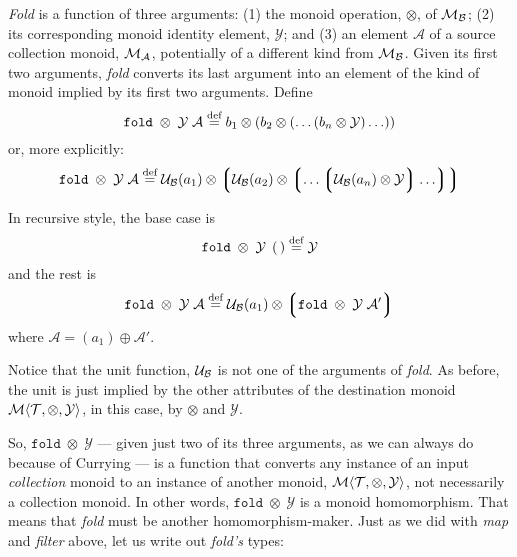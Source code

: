 \emph{Fold} is a function of three arguments: (1) the monoid operation, $\otimes$, of $\mathcal{M}_{\mathcal{B}}$; (2) its corresponding monoid identity element, $\mathcal{Y}$; and (3) an element $\mathcal{A}$ of a source collection monoid, $\mathcal{M}_{\mathcal{A}}$, potentially of a different kind from $\mathcal{M}_{\mathcal{B}}$. Given its first two arguments, \emph{fold} converts its last argument into an element of the kind of monoid implied by its first two arguments. Define
\begin{equation}
    \mathtt{fold}\;\otimes\;\mathcal{Y}\;\mathcal{A} \overset{\text{def}}{=}
        b_{1}\otimes
        (b_{2}\otimes
        (\ldots(b_{n}\otimes
        \mathit{\mathcal{Y}})\ldots))
  \label{eqn:folddef}
\end{equation}
or, more explicitly:
  $$ \mathtt{fold}\;\otimes\;\mathcal{Y}\;\mathcal{A} \overset{\text{def}}{=}
        \mathcal{U}_{\mathcal{B}}(a_1)\otimes
        \left\lgroup
        \mathcal{U}_{\mathcal{B}}(a_2)\otimes
        \left\lgroup\ldots\left\lgroup
        \mathcal{U}_{\mathcal{B}}(a_n)\otimes
        \mathit{\mathcal{Y}}
        \right\rgroup\ldots\right\rgroup
        \right\rgroup $$


In recursive style, the base case is
\begin{equation}
  \mathtt{fold}\;\otimes\;\mathcal{Y}\;\left(\,\right)\overset{\text{def}}{=}\mathcal{Y}
\end{equation}
and the rest is
\begin{equation}
  \mathtt{fold}\;\otimes\;\mathcal{Y}\;\mathcal{A} \overset{\text{def}}{=}
    \mathcal{U}_{\mathcal{B}}(a_1)\otimes
    \left\lgroup
    \mathtt{fold}\;\otimes\;\mathcal{Y}\;\mathcal{A}'
    \right\rgroup
\end{equation}
where $\mathcal{A}=(a_1)\oplus\mathcal{A}'$.


Notice that the unit function, $\mathcal{U}_{\mathcal{B}}$ is not one of the arguments of \emph{fold}. As before, the unit is just implied by the other attributes of the destination monoid $\mathcal{M}\langle{\mathcal{T}},{\otimes},{\mathcal{Y}}\rangle$, in this case, by $\otimes$ and $\mathcal{Y}$.


So, $\mathtt{fold}\;\otimes\;\mathcal{Y}$ --- given just two of its three arguments, as we can always do because of Currying --- is a function that converts any instance of an input \emph{collection} monoid to an instance of another monoid, $\mathcal{M}\langle{\mathcal{T}},{\otimes},{\mathcal{Y}}\rangle$, not necessarily a collection monoid. In other words, $\mathtt{fold}\;\otimes\;\mathcal{Y}$ is a monoid homomorphism. That means that \emph{fold} must be another homomorphism-maker. Just as we did with \emph{map} and \emph{filter} above, let us write out \emph{fold's} types:


